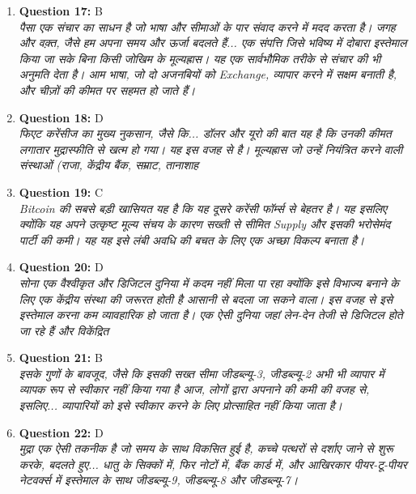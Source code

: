 \documentclass[12pt,a4paper]{article}
\begin{document}
\begin{enumerate}
\item \textbf{Question 17:} B
\\ \textit{पैसा एक संचार का साधन है जो भाषा और सीमाओं के पार संवाद करने में मदद करता है। जगह और वक़्त, जैसे हम अपना समय और ऊर्जा बदलते हैं... एक संपत्ति जिसे भविष्य में दोबारा इस्तेमाल किया जा सके बिना किसी जोखिम के मूल्यह्रास। यह एक सार्वभौमिक तरीके से संचार की भी अनुमति देता है। आम भाषा, जो दो अजनबियों को Exchange, व्यापार करने में सक्षम बनाती है, और चीज़ों की कीमत पर सहमत हो जाते हैं।}

\item \textbf{Question 18:} D
\\ \textit{फिएट करेंसीज का मुख्य नुकसान, जैसे कि... डॉलर और यूरो की बात यह है कि उनकी कीमत लगातार मुद्रास्फीति से खत्म हो गया। यह इस वजह से है। मूल्यह्रास जो उन्हें नियंत्रित करने वाली संस्थाओं (राजा, केंद्रीय बैंक, सम्राट, तानाशाह}

\item \textbf{Question 19:} C
\\ \textit{Bitcoin की सबसे बड़ी खासियत यह है कि यह दूसरे करेंसी फॉर्म्स से बेहतर है। यह इसलिए क्योंकि यह अपने उत्कृष्ट मूल्य संचय के कारण सख्ती से सीमित Supply और इसकी भरोसेमंद पार्टी की कमी। यह यह इसे लंबी अवधि की बचत के लिए एक अच्छा विकल्प बनाता है।}

\item \textbf{Question 20:} D
\\ \textit{सोना एक वैश्वीकृत और डिजिटल दुनिया में कदम नहीं मिला पा रहा क्योंकि इसे विभाज्य बनाने के लिए एक केंद्रीय संस्था की जरूरत होती है आसानी से बदला जा सकने वाला। इस वजह से इसे इस्तेमाल करना कम व्यावहारिक हो जाता है। एक ऐसी दुनिया जहां लेन-देन तेजी से डिजिटल होते जा रहे हैं और विकेंद्रित}

\item \textbf{Question 21:} B
\\ \textit{इसके गुणों के बावजूद, जैसे कि इसकी सख्त सीमा जीडब्ल्यू-3, जीडब्ल्यू-2 अभी भी व्यापार में व्यापक रूप से स्वीकार नहीं किया गया है आज, लोगों द्वारा अपनाने की कमी की वजह से, इसलिए... व्यापारियों को इसे स्वीकार करने के लिए प्रोत्साहित नहीं किया जाता है।}

\item \textbf{Question 22:} D
\\ \textit{मुद्रा एक ऐसी तकनीक है जो समय के साथ विकसित हुई है, कच्चे पत्थरों से दर्शाए जाने से शुरू करके, बदलते हुए... धातु के सिक्कों में, फिर नोटों में, बैंक कार्ड में, और आखिरकार पीयर-टू-पीयर नेटवर्क्स में इस्तेमाल के साथ जीडब्ल्यू-9, जीडब्ल्यू-8 और जीडब्ल्यू-7।}


\end{enumerate}
\end{document}
